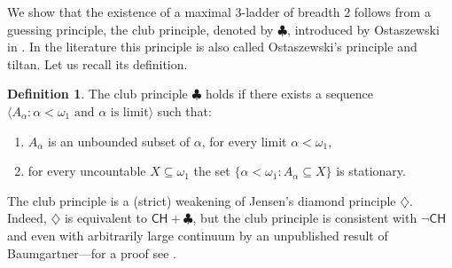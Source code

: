 \documentclass[]{amsart}
\theoremstyle{definition}
\newtheorem{definition}[theorem]{Definition}
\theoremstyle{remark}
\begin{document}
We show that the existence of a maximal $3$-ladder of breadth $2$ follows from a guessing principle, the club principle, denoted by $\clubsuit$, introduced by Ostaszewski in \cite{MR454941}. In the literature this principle is also called Ostaszewski's principle and tiltan. Let us recall its definition.
\begin{definition}
The club principle $\clubsuit$ holds if there exists a sequence $\langle A_\alpha : \alpha < \omega_1 \text{ and } \alpha \text{ is limit}\rangle$ such that:
\begin{enumerate}
\item $A_\alpha$ is an unbounded subset of $\alpha$, for every limit $\alpha < \omega_1$,
\item for every uncountable $X\subseteq \omega_1$ the set $\{\alpha < \omega_1 : A_\alpha \subseteq X\}$ is stationary.
\end{enumerate}
\end{definition}
The club principle is a (strict) weakening of Jensen's diamond principle $\diamondsuit$. Indeed, $\diamondsuit$ is equivalent to $\mathsf{CH}+\clubsuit$, but the club principle is consistent with $\neg \mathsf{CH}$ \cite[Theorem 7.4]{MR1623206} and even with arbitrarily large continuum by an unpublished result of Baumgartner---for a proof see \cite{MR1900391}. 
\end{document}
